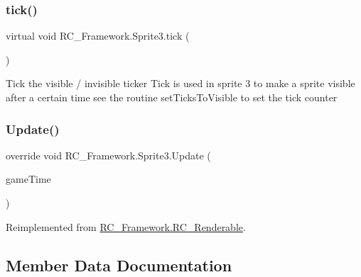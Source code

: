 \subsubsection{\texorpdfstring{tick()}{tick()}}
{\footnotesize\ttfamily virtual void R\+C\+\_\+\+Framework.\+Sprite3.\+tick (\begin{DoxyParamCaption}{ }\end{DoxyParamCaption})\hspace{0.3cm}{\ttfamily [virtual]}}



Tick the visible / invisible ticker Tick is used in sprite 3 to make a sprite visible after a certain time see the routine set\+Ticks\+To\+Visible to set the tick counter 

\mbox{\label{class_r_c___framework_1_1_sprite3_a5473d37c4f1f44fa1685dd64c82dfd8c}} 
\subsubsection{\texorpdfstring{Update()}{Update()}}
{\footnotesize\ttfamily override void R\+C\+\_\+\+Framework.\+Sprite3.\+Update (\begin{DoxyParamCaption}\item[{Game\+Time}]{game\+Time }\end{DoxyParamCaption})\hspace{0.3cm}{\ttfamily [virtual]}}



Reimplemented from \mbox{\hyperlink{class_r_c___framework_1_1_r_c___renderable_a5745bedc7ba0587aa1e1d8563c357228}{R\+C\+\_\+\+Framework.\+R\+C\+\_\+\+Renderable}}.



\subsection{Member Data Documentation}
\mbox{\label{class_r_c___framework_1_1_sprite3_ae5664f646ee00d658a5d3087c78e9c8b}} 
